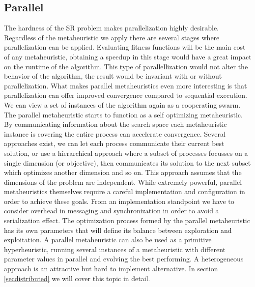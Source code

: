 \subsection{Parallel}
The hardness of the SR problem makes parallelization highly desirable. Regardless of the metaheuristic we apply there are several stages where parallelization can be applied. Evaluating fitness functions will be the main cost of any metaheuristic, obtaining a speedup in this stage would have a great impact on the runtime of the algorithm. This type of parallellization would not alter the behavior of the algorithm, the result would be invariant with or without parallelization. 
What makes parallel metaheuristics even more interesting is that parallelization can offer improved convergence compared to sequential execution. We can view a set of instances of the algorithm again as a cooperating swarm. The parallel metaheuristic starts to function as a self optimizing metaheuristic. By communicating information about the search space each metaheuristic instance is covering the entire process can accelerate convergence. 
Several approaches exist, we can let each process communicate their current best solution, or use a hierarchical approach where a subset of processes focusses on a single dimension (or objective), then communicates its solution to the next subset which optimizes another dimension and so on. This approach assumes that the dimensions of the problem are independent.
While extremely powerful, parallel metaheuristics themselves require a careful implementation and configuration in order to achieve these goals. From an implementation standpoint we have to consider overhead in messaging and synchronization in order to avoid a serialization effect. The optimization process formed by the parallel metaheuristic has its own parameters that will define its balance between exploration and exploitation. A parallel metaheuristic can also be used as a primitive hyperheuristic, running several instances of a metaheuristic with different parameter values in parallel and evolving the best performing. A heterogeneous approach is an attractive but hard to implement alternative. In section \ref{secdistributed} we will cover this topic in detail.